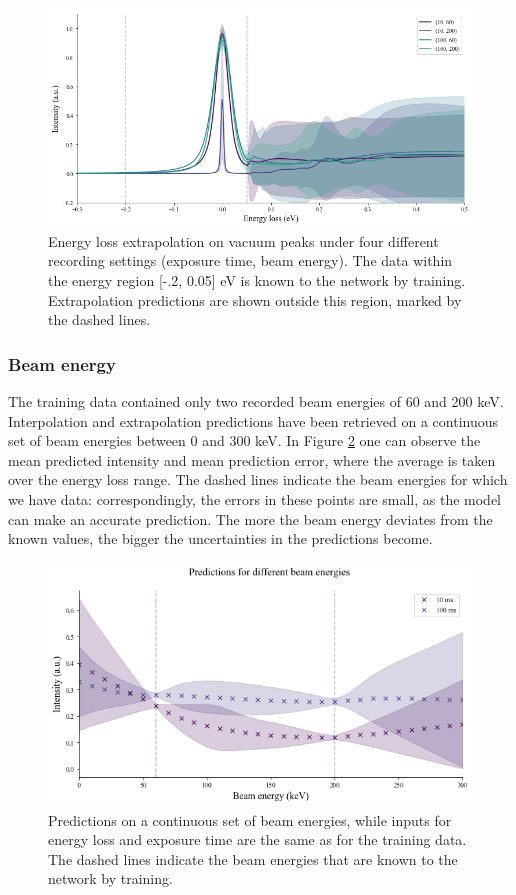 \begin{figure}[H]
    \centering
    \includegraphics[width=120mm]{plots/extrapolate_energyloss.png}
    \caption{Energy loss extrapolation on vacuum peaks under four different recording settings (exposure time, beam energy). The data within the energy region [-.2, 0.05] eV is known to the network by training. Extrapolation predictions are shown outside this region, marked by the dashed lines.   }
    \label{fig:extrapoleloss}
\end{figure}



\subsubsection{Beam energy}
The training data contained only two recorded beam energies of 60 and 200 keV. Interpolation and extrapolation predictions have been retrieved on a continuous set of beam energies between 0 and 300 keV. In Figure \ref{fig:extrapolbeam} one can observe the mean predicted intensity and mean prediction error, where the average is taken over the energy loss range. The dashed lines indicate the beam energies for which we have data: correspondingly, the errors in these points are small, as the model can make an accurate prediction. The more the beam energy deviates from the known values, the bigger the uncertainties in the predictions become. 

\begin{figure}[H]
    \centering
    \includegraphics[width=120mm]{plots/Extrapolate_beamenergy.png}
    \caption{Predictions on a continuous set of beam energies, while inputs for energy loss and exposure time are the same as for the training data. The dashed lines indicate the beam energies that are known to the network by training.}
    \label{fig:extrapolbeam}
\end{figure}

